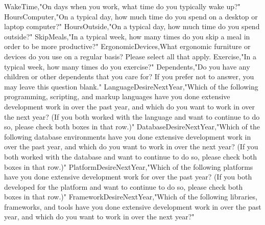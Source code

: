 \begin{appendices}
WakeTime,"On days when you work, what time do you typically wake up?"
HoursComputer,"On a typical day, how much time do you spend on a desktop or laptop computer?"
HoursOutside,"On a typical day, how much time do you spend outside?"
SkipMeals,"In a typical week, how many times do you skip a meal in order to be more productive?"
ErgonomicDevices,What ergonomic furniture or devices do you use on a regular basis? Please select all that apply.
Exercise,"In a typical week, how many times do you exercise?"
Dependents,"Do you have any children or other dependents that you care for? If you prefer not to answer, you may leave this question blank."
LanguageDesireNextYear,"Which of the following programming, scripting, and markup languages have you done extensive development work in over the past year, and which do you want to work in over the next year?  (If you both worked with the language and want to continue to do so, please check both boxes in that row.)"
DatabaseDesireNextYear,"Which of the following database environments have you done extensive development work in over the past year, and which do you want to work in over the next year?   (If you both worked with the database and want to continue to do so, please check both boxes in that row.)"
PlatformDesireNextYear,"Which of the following platforms have you done extensive development work for over the past year?   (If you both developed for the platform and want to continue to do so, please check both boxes in that row.)"
FrameworkDesireNextYear,"Which of the following libraries, frameworks, and tools have you done extensive development work in over the past year, and which do you want to work in over the next year?"



\end{appendices}
